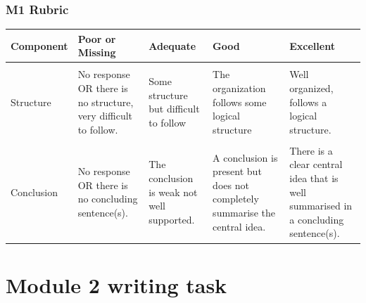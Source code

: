\documentclass[
  openany]{book}
\begin{document}
\hypertarget{m1-rubric}{%
\subsubsection{M1 Rubric}\label{m1-rubric}}

\begin{table}
\centering\begingroup\fontsize{8}{10}\selectfont

\begin{tabular}{l>{\raggedright\arraybackslash}p{12em}>{\raggedright\arraybackslash}p{12em}>{\raggedright\arraybackslash}p{12em}>{\raggedright\arraybackslash}p{12em}}
\toprule
Component & Poor or Missing & Adequate & Good & Excellent\\
\midrule
\cellcolor{gray!6}{Addresses prompt} & \cellcolor{gray!6}{No response OR does not address one of the prompts for this week.} & \cellcolor{gray!6}{While the prompt is somewhat addressed, there is a lot missing and/or much of the response is not relevant/off-topic.} & \cellcolor{gray!6}{Prompt is addressed, though may go somewhat off-topic at points, or lacks some depth in its coverage.} & \cellcolor{gray!6}{Prompt is clearly and comprehensively addressed.}\\
Structure & No response OR there is no structure, very difficult to follow. & Some structure but difficult to follow & The organization follows some logical structure & Well organized, follows a logical structure.\\
\cellcolor{gray!6}{Writing mechanics} & \cellcolor{gray!6}{No response OR considerable writing and grammatical issues that completely obscure the meaning OR lots of slang and inappropriate word choice.} & \cellcolor{gray!6}{Multiple sections are difficult to read, but is otherwise understandable.} & \cellcolor{gray!6}{Slight difficulty in understanding one or two sections.} & \cellcolor{gray!6}{Can read and follow along with minimal effort. Some grammatical or word choice errors are allowable, but they must not obstruct meaning.}\\
Conclusion & No response OR there is no concluding sentence(s). & The conclusion is weak not well supported. & A conclusion is present but does not completely summarise the central idea. & There is a clear central idea that is well summarised in a concluding sentence(s).\\
\bottomrule
\end{tabular}
\endgroup{}
\end{table}

\hypertarget{module-2-writing-task}{%
\section{Module 2 writing task}\label{module-2-writing-task}}
\end{document}
